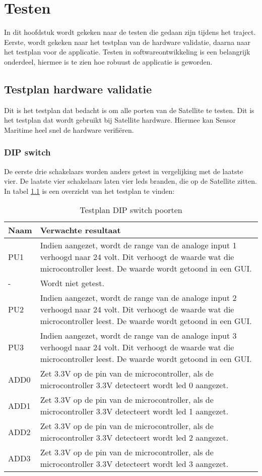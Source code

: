 \chapter{Testen}
In dit hoofdstuk wordt gekeken naar de testen die gedaan zijn tijdens het traject. Eerste, wordt gekeken naar het testplan van de hardware validatie, daarna naar het testplan voor de applicatie. Testen in softwareontwikkeling is een belangrijk onderdeel, hiermee is te zien hoe robuust de applicatie is geworden.

\section{Testplan hardware validatie} \label{sec:hwtestplan}
Dit is het testplan dat bedacht is om alle porten van de Satellite te testen. Dit is het testplan dat wordt gebruikt bij Satellite hardware. Hiermee kan Sensor Maritime heel snel de hardware verifiëren.
\subsection{DIP switch} \label{sec:dip}
De eerste drie schakelaars worden anders getest in vergelijking met de laatste vier. De laatste vier schakelaars laten vier leds branden, die op de Satellite zitten. In tabel \ref{tab:hw_val_dip_testplan} is een overzicht van het testplan te vinden:
\begin{table}[h!]
	\caption{Testplan DIP switch poorten}
	\begin{tabular}{lp{14.5cm}}
	\toprule
	\textbf{Naam} 	& \textbf{Verwachte resultaat} \\ \toprule
	PU1				& Indien aangezet, wordt de range van de analoge input 1 verhoogd naar 24 volt. Dit verhoogt de waarde wat die microcontroller leest. De waarde wordt getoond in een GUI.\\
	-				& Wordt niet getest. \\
	PU2				& Indien aangezet, wordt de range van de analoge input 2 verhoogd naar 24 volt. Dit verhoogt de waarde wat die microcontroller leest. De waarde wordt getoond in een GUI.\\
	PU3				& Indien aangezet, wordt de range van de analoge input 3 verhoogd naar 24 volt. Dit verhoogt de waarde wat die microcontroller leest. De waarde wordt getoond in een GUI. \\
	ADD0 			& Zet 3.3V op de pin van de microcontroller, als de microcontroller 3.3V detecteert wordt led 0 aangezet.\\
	ADD1 			& Zet 3.3V op de pin van de microcontroller, als de microcontroller 3.3V detecteert wordt led 1 aangezet.\\
	ADD2 			& Zet 3.3V op de pin van de microcontroller, als de microcontroller 3.3V detecteert wordt led 2 aangezet.\\
	ADD3 			& Zet 3.3V op de pin van de microcontroller, als de microcontroller 3.3V detecteert wordt led 3 aangezet.\\ \bottomrule
	\end{tabular}
	\label{tab:hw_val_dip_testplan}
\end{table}

